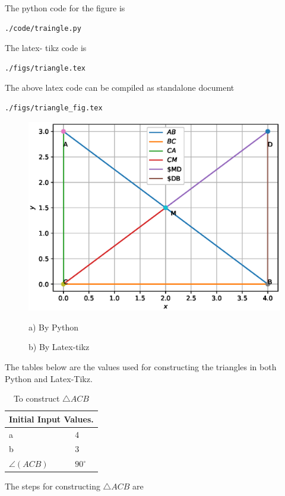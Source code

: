 
\begin{flushleft}
The python code for the figure is
\begin{lstlisting}
./code/traingle.py
\end{lstlisting}
The latex- tikz code is
\begin{lstlisting}
./figs/triangle.tex
\end{lstlisting}
The above latex code can be compiled as standalone document
\begin{lstlisting}
./figs/triangle_fig.tex
\end{lstlisting}
\end{flushleft}
\begin{figure}[H]
\includegraphics[scale=0.4]{./figs/triangle.eps}
\caption*{a) By Python}
%

\caption*{b) By Latex-tikz}
%
\end{figure}
The tables below are the values used for constructing the triangles in both Python and Latex-Tikz.
\begin{table}[H]
\centering
\begin{tabular}{ |p{3cm}|p{3cm}|  }
\hline
 \multicolumn{2}{|c|}{Initial Input Values.} \\
\hline
a & 4\\
\hline
b & 3\\
\hline
$\angle(ACB)$ & $90^{\circ}$ \\
\hline
\end{tabular}
\caption{To construct $\triangle ACB$}
\end{table}
The steps for constructing $\triangle ACB$ are
